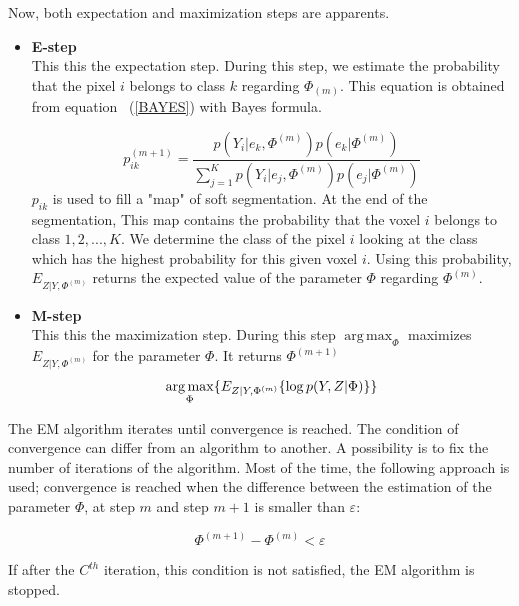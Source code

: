 Now, both expectation and maximization steps are apparents.\\
\begin{itemize}
\item \textbf{E-step}\\
This this the expectation step. During this step, we estimate the probability that the pixel $i$ belongs to class $k$ regarding $\Phi_{(m)}$. This equation is obtained from equation ~(\ref{BAYES}) with Bayes formula.

  \begin{equation}\label{ESTEP1}
  p_{ik}^{(m+1)} = \frac{p(Y_i|e_k,\Phi^{(m)})p(e_k|\Phi^{(m)})}{\sum_{j=1}^K   p(Y_i|e_j,\Phi^{(m)}) p(e_{j}|\Phi^{(m)})}  
  \end{equation}
$p_{ik}$ is used to fill a "map" of soft segmentation. At the end of the segmentation, This map contains the probability that the voxel $i$ belongs to class $1, 2, ..., K$. We determine the class of the pixel $i$ looking at the class which has the highest probability for this given voxel $i$.
Using this probability, $E_{Z|Y,\Phi^{(m)}}$ returns the expected value of the parameter $\Phi$ regarding $\Phi^{(m)}$.\\


\item \textbf{M-step}\\
This this the maximization step. During this step $\operatorname*{arg\,max}_\Phi$ maximizes $E_{Z|Y,\Phi^{(m)}}$ for the parameter $\Phi$. It returns $\Phi^{(m+1)}$
  \begin{equation}
  \operatorname*{arg\,max}_\Phi \{ E_{Z|Y,\Phi^{(m)}} \{\operatorname*{log} p(Y,Z|\Phi)\}\}\\
  \end{equation}
 
\end{itemize} 
  
The EM algorithm iterates until convergence is reached. The condition of convergence can differ from an algorithm to another. A possibility is to fix the number of iterations of the algorithm. Most of the time, the following approach is used; convergence is reached when the difference between the estimation of the parameter $\Phi$, at step $m$ and step $m+1$ is smaller than $\varepsilon$:

  \begin{equation*}
  \Phi^{(m+1)}-\Phi^{(m)} < \varepsilon
  \end{equation*}

If after the $C^{th}$ iteration, this condition is not satisfied, the EM algorithm is stopped. \\

